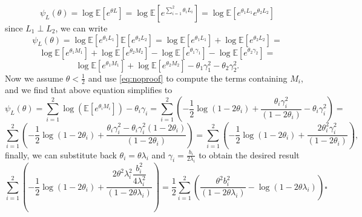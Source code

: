 \documentclass{article}
\begin{document}
\begin{equation*}
    \psi_L(\theta) = \log\mathbb{E}[e^{\theta L}] = \log\mathbb{E}[e^{\sum_{i=1}^2 \theta_i L_i}] = \log\mathbb{E}[e^{\theta_1 L_1}e^{\theta_2 L_2}] 
\end{equation*}
since $L_1 \perp L_2$, we can write
\begin{equation*}
    \psi_L(\theta) = \log\mathbb{E}[e^{\theta_1 L_1}]\mathbb{E}[e^{\theta_2 L_2}] = \log\mathbb{E}[e^{\theta_1 L_1}] + \log\mathbb{E}[e^{\theta_2 L_2}] =
\end{equation*}
$$\log\mathbb{E}[e^{\theta_1 M_1}] + \log\mathbb{E}[e^{\theta_2M_2}] - \log\mathbb{E}[e^{\theta_1\gamma_1}] - \log\mathbb{E}[e^{\theta_2\gamma_2}] = $$
$$\log\mathbb{E}[e^{\theta_1 M_1}] + \log\mathbb{E}[e^{\theta_2M_2}] - \theta_1\gamma_1^2 - \theta_2\gamma_2^2.$$
Now we assume $\theta < \frac{1}{2}$ and use \eqref{eq:noproof} to compute the terms containing $M_i$, and we find that above equation simplifies to
\begin{equation*}
    \psi_L(\theta) = \sum_{i=1}^2 \log(\mathbb{E}[e^{\theta_i M_i}]) - \theta_i\gamma_i = \sum_{i=1}^2 \left(-\frac{1}{2}\log(1-2\theta_i) + \frac{\theta_i \gamma_i^2}{(1-2\theta_i)} - \theta_i\gamma_i^2\right) =
\end{equation*}
$$
    \sum_{i=1}^2 \left(-\frac{1}{2}\log(1-2\theta_i) + \frac{\theta_i \gamma_i^2- \theta_i\gamma_i^2(1-2\theta_i)}{(1-2\theta_i)}\right) = \sum_{i=1}^2 \left(-\frac{1}{2}\log(1-2\theta_i) + \frac{2\theta_i^2\gamma_i^2}{(1-2\theta_i)}\right),
$$
finally, we can substitute back $\theta_i = \theta\lambda_i$ and $\gamma_i = \frac{b_i}{2\lambda_i}$ to obtain the desired result
\begin{equation*}
    \sum_{i=1}^2 \left(-\frac{1}{2}\log(1-2\theta_i) + \frac{2\theta^2\lambda_i^2\dfrac{b_i^2}{4\lambda_i^2}}{(1-2\theta\lambda_i)}\right) = \dfrac{1}{2}\sum_{i = 1}^2\left(\dfrac{\theta^2b_i^2}{(1-2\theta\lambda_i)} - \log(1 - 2\theta\lambda_i)\right) \square
\end{equation*}
\end{document}
